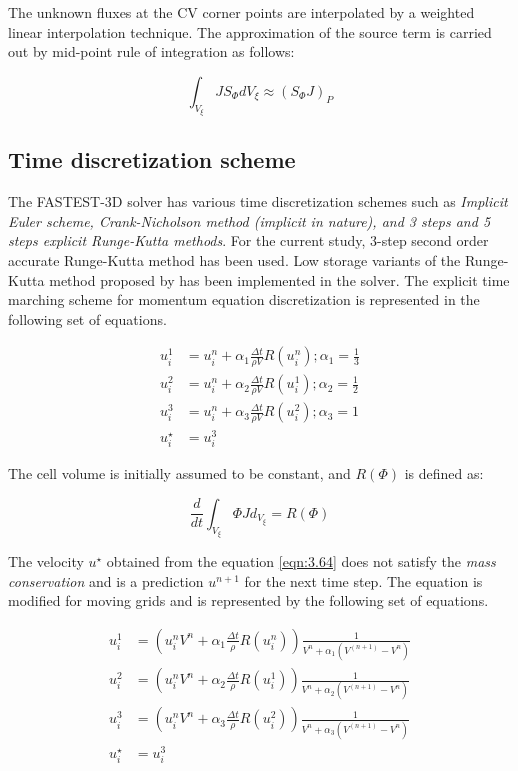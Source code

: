 The unknown fluxes at the CV corner points are interpolated by a weighted linear interpolation technique. The approximation of the source term is carried out by mid-point rule of integration as follows:

\begin{equation}
\int_{V_{\xi}} J S_{\Phi} dV_{\xi} \approx \left(S_{\Phi} J \right)_P
\label{eqn:3.60}
\end{equation}

\subsection{Time discretization scheme}
The FASTEST-3D solver has various time discretization schemes such as \textit{Implicit Euler scheme, Crank-Nicholson method (implicit in nature), and 3 steps and 5 steps explicit Runge-Kutta methods}. For the current study, 3-step second order accurate Runge-Kutta method has been used. Low storage variants of the Runge-Kutta method proposed by \citet{williamson1980low} has been implemented in the solver. The explicit time marching scheme for momentum equation discretization is represented in the following set of equations. 

\begin{align}
u_i^1 & = u_i^n + \alpha_1 \frac{\Delta t}{\rho V} R\left(u_i^n\right) ; \alpha_1 = \frac{1}{3}\\
u_i^2 & = u_i^n + \alpha_2 \frac{\Delta t}{\rho V} R\left(u_i^1\right) ; \alpha_2 = \frac{1}{2}\\
u_i^3 & = u_i^n + \alpha_3 \frac{\Delta t}{\rho V} R\left(u_i^2\right) ; \alpha_3 = 1\\
u_i^{\star} &= u_i^3
\label{eqn:3.64}
\end{align}

The cell volume is initially assumed to be constant, and $R(\Phi)$ is defined as: 

\begin{equation}
\frac{d}{dt} \int_{{V}_{\xi}} \Phi J d_{{V}_{\xi}} = R\left(\Phi\right)
\label{eqn:3.65}
\end{equation}

The velocity $u^{\star}$ obtained from the equation \ref{eqn:3.64} does not satisfy the \textit{mass conservation} and is a prediction $u^{n+1}$ for the next time step. The equation is modified for moving grids and is represented by the following set of equations.

\begin{align}
u_i^1 & = \left(u_i^n V^n + \alpha_1 \frac{\Delta t}{\rho} R\left(u_i^n \right) \right) \frac{1}{V^n + \alpha_1 \left(V^{\left(n+1\right)} - V^n \right)}\\
u_i^2 & = \left(u_i^n V^n + \alpha_2 \frac{\Delta t}{\rho} R\left(u_i^1 \right) \right)\frac{1}{V^n + \alpha_2 \left(V^{\left(n+1\right)} - V^n \right)}\\
u_i^3 & = \left(u_i^n V^n + \alpha_3 \frac{\Delta t}{\rho} R\left(u_i^2 \right) \right)\frac{1}{V^n + \alpha_3 \left(V^{\left(n+1\right)} - V^n \right)}\\
u_i^{\star} &= u_i^3
\label{eqn:3.69}
\end{align}

